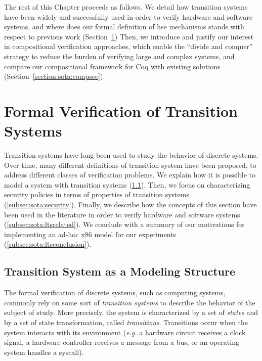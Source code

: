 The rest of this Chapter proceeds as follows.
%
We detail how transition systems have been widely and successfully used in order
to verify hardware and software systems, and where does our formal definition of
\ac{hse} mechanisms stands with respect to previous work
(Section~\ref{sec:sota:formalisms})
%
Then, we introduce and justify our interest in compositional verification
approaches, which enable the ``divide and conquer'' strategy to reduce the
burden of verifying large and complex systems, and compare our compositional
framework for Coq with existing solutions (Section~\ref{section:sota:compsec}).

\section{Formal Verification of Transition Systems}
\label{sec:sota:formalisms}

Transition systems have long been used to study the behavior of discrete
systems. 
%
Over time, many different definitions of transition system have been proposed,
to address different classes of verification problems.
%
We explain how it is possible to model a system with transition systems
(\ref{subsec:sota:ltsdef}).
%
Then, we focus on characterizing security policies in terms of properties of
transition systems (\ref{subsec:sota:security}).
%
Finally, we describe how the concepts of this section have been used in the
literature in order to verify hardware and software systems
(\ref{subsec:sota:ltsrelated}).
%
We conclude with a summary of our motivations for implementing an ad-hoc x86
model for our experiments (\ref{subsec:sota:ltsconclusion}).

\subsection{Transition System as a Modeling Structure}
\label{subsec:sota:ltsdef}

The formal verification of discrete systems, such as computing systems, commonly
rely on some sort of \emph{transition systems} to describe the behavior of the
subject of study.
%
%
%
More precisely, the system is characterized by a set of \emph{states} and by a
set of state transformation, called \emph{transitions}.
%
Transitions occur when the system interacts with its environment (\emph{e.g.} a
hardware circuit receives a clock signal, a hardware controller receives a
message from a bus, or an operating system handles a syscall).

